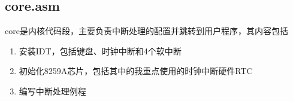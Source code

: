 \documentclass[a4paper,11pt,UTF8]{ctexart}
\begin{document}


	\subsection{core.asm}
	core是内核代码段，主要负责中断处理的配置并跳转到用户程序，其内容包括
	\begin{enumerate}
		\item 安装IDT，包括键盘、时钟中断和4个软中断
		\item 初始化8259A芯片，包括其中的我重点使用的时钟中断硬件RTC
		\item 编写中断处理例程
	\end{enumerate}
	
\end{document}
